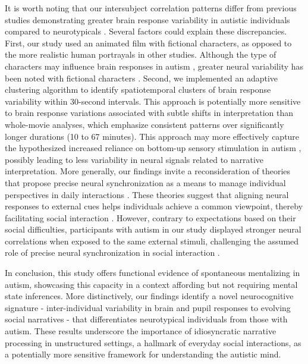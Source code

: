 It is worth noting that our intersubject correlation patterns differ from previous studies demonstrating greater brain response variability in autistic individuals compared to neurotypicals \citep{byrge2015,hahamy2015,hasson2009,lyons2020,nunes2019,ou2022,pegado2020,salmi2013}. Several factors could explain these discrepancies. First, our study used an animated film with fictional characters, as opposed to the more realistic human portrayals in other studies. Although the type of characters may influence brain responses in autism \citep{atherton2018}, greater neural variability has been noted with fictional characters \citep{lyons2020}. Second, we implemented an adaptive clustering algorithm to identify spatiotemporal clusters of brain response variability within 30-second intervals. This approach is potentially more sensitive to brain response variations associated with subtle shifts in interpretation than whole-movie analyses, which emphasize consistent patterns over significantly longer durations (10 to 67 minutes). This approach may more effectively capture the hypothesized increased reliance on bottom-up sensory stimulation in autism \citep{pellicano2012}, possibly leading to less variability in neural signals related to narrative interpretation. More generally, our findings invite a reconsideration of theories that propose precise neural synchronization as a means to manage individual perspectives in daily interactions \citep{holroyd2022}. These theories suggest that aligning neural responses to external cues helps individuals achieve a common viewpoint, thereby facilitating social interaction \citep{hasson2012,mayo2021}. However, contrary to expectations based on their social difficulties, participants with autism in our study displayed stronger neural correlations when exposed to the same external stimuli, challenging the assumed role of precise neural synchronization in social interaction \citep{stolk2014}.

In conclusion, this study offers functional evidence of spontaneous mentalizing in autism, showcasing this capacity in a context affording but not requiring mental state inferences. More distinctively, our findings identify a novel neurocognitive signature - inter-individual variability in brain and pupil responses to evolving social narratives - that differentiates neurotypical individuals from those with autism. These results underscore the importance of idiosyncratic narrative processing in unstructured settings, a hallmark of everyday social interactions, as a potentially more sensitive framework for understanding the autistic mind.
\newpage  

